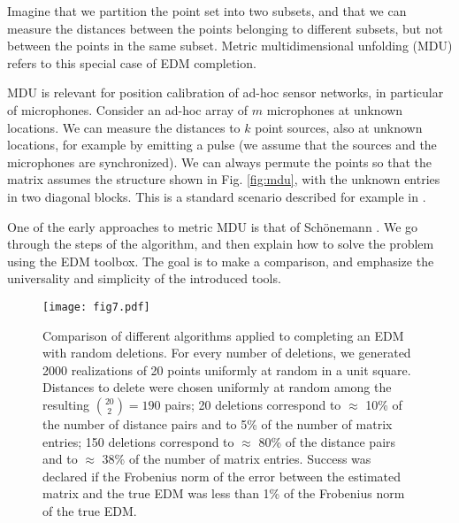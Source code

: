 \documentclass[10pt,double]{IEEEtran}
\newcommand{\rev}[1]{{#1}}
\begin{document}
Imagine that we partition the point set into two subsets, and that we can
measure the distances between the points belonging to different subsets, but
not between the points in the same subset. Metric multidimensional unfolding (MDU)
\cite{Schonemann:1970wd} refers to this special case of EDM completion. 

MDU is relevant for position calibration of ad-hoc sensor networks, in
particular of microphones. Consider an ad-hoc array of $m$ microphones at
unknown locations. We can measure the distances to $k$ point sources, also at
unknown locations, for example by emitting a pulse (we assume that the sources
and the microphones are synchronized). We can always permute the points so
that the matrix assumes the structure shown in Fig. \ref{fig:mdu}, with the
unknown entries in two diagonal blocks. This is a standard scenario described
for example in \cite{Crocco:2012eu}.

One of the early approaches to metric MDU is that of Sch\"onemann
\cite{Schonemann:1970wd}. We go through the steps of the algorithm, and then
explain how to solve the problem using the EDM toolbox. The goal is to make a
comparison, and emphasize the universality and simplicity of the introduced
tools.


\begin{figure}[t!]
  \centering
  \texttt{[image: fig7.pdf]}
  \caption{Comparison of different algorithms applied to completing an EDM
  with random deletions. For every number of deletions, we generated 2000
  realizations of 20 points uniformly at random in a unit square. Distances to
  delete were chosen uniformly at random among the resulting $\binom{20}{2} =
  190$ pairs; \rev{20 deletions correspond to $\approx$ 10\% of the number of
  distance pairs and to 5\% of the number of matrix entries; 150 deletions
  correspond to $\approx$ 80\% of the distance pairs and to $\approx$ 38\% of
  the number of matrix entries.} Success was declared if the Frobenius norm of
  the error between the estimated matrix and the true EDM was less than 1\% of
  the Frobenius norm of the true EDM.}
  \label{fig:success_random}
\end{figure}
\end{document}
